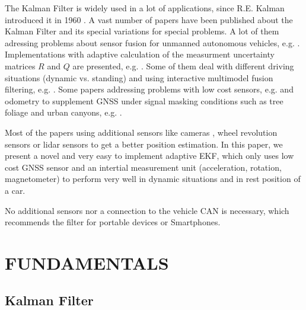 \documentclass[a4paper,twoside]{article}
\begin{document}
\noindent The Kalman Filter is widely used in a lot of applications, since R.E. Kalman introduced it in 1960 \cite{Kalman1960}. A vast number of papers have been published about the Kalman Filter and its special variations for special problems. A lot of them adressing problems about sensor fusion for unmanned autonomous vehicles, e.g. \cite{Penarrocha2010,Mourikis2007,Sun2010,Barczyk2011}. Implementations with adaptive calculation of the measurment uncertainty matrices $R$ and $Q$ are presented, e.g. \cite{Bistrovs2012}. Some of them deal with different driving situations (dynamic vs. standing) and using interactive multimodel fusion filtering, e.g. \cite{Toledo-Moreo2007,Stephen2001}. Some papers addressing problems with low cost sensors, e.g. \cite{Rosenberg2006,Toledo-Moreo2007,Kingston2004} and odometry
to supplement GNSS under signal masking conditions such as tree foliage and urban canyons, e.g. \cite{Stephen2001}.

Most of the papers using additional sensors like cameras \cite{Effertz2009,Holt2004}, wheel revolution sensors \cite{Stephen2001} or lidar sensors \cite{Holt2004} to get a better position estimation.
In this paper, we present a novel and very easy to implement adaptive EKF, which only uses low cost GNSS sensor and an intertial measurement unit (acceleration, rotation, magnetometer) to perform very well in dynamic situations and in rest position of a car.

No additional sensors nor a connection to the vehicle CAN is necessary, which recommends the filter for portable devices or Smartphones.

\section{\uppercase{Fundamentals}}

\subsection{Kalman Filter}
\end{document}
